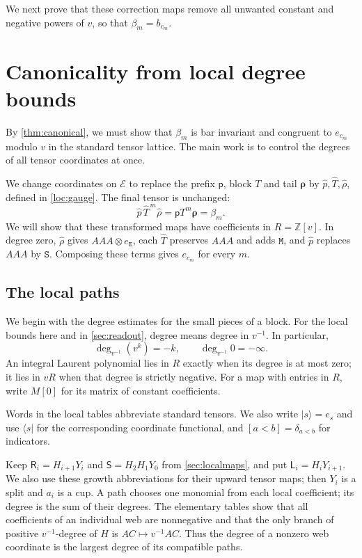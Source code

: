 \documentclass[a4paper,11pt]{amsart}
\newcommand{\Z}{\mathbb Z}
\newcommand{\wordstart}{\mathtt{S}}
\newcommand{\wordmiddle}{\mathtt{M}}
\newcommand{\wordend}{\mathtt{E}}
\newcommand{\pp}{\mathsf p}
\newcommand{\tailmap}{\boldsymbol{\rho}}
\newcommand{\tpar}{v}
\newcommand{\vpar}{{\tpar^{-1}}}
\numberwithin{equation}{subsection}
\theoremstyle{plain}
\theoremstyle{definition}
\theoremstyle{remark}
\begin{document}
We next prove that these correction maps remove all unwanted constant
and negative powers of $\tpar$, so that $\beta_m=b_{c_m}$.

\section{Canonicality from local degree bounds}\label{sec:canonicality}

By \autoref{thm:canonical}, we must show that $\beta_m$ is bar invariant
and congruent to $e_{c_m}$ modulo $\tpar$ in the standard tensor lattice.
The main work is to control the degrees of all tensor coordinates
at once.

We change coordinates on $\mathcal E$ to replace the prefix $\pp$,
block $T$ and tail $\tailmap$ by $\widehat p,\widehat T,\widehat\rho$,
defined in \autoref{loc:gauge}. The final tensor is unchanged:
{
\[
\widehat p\,\widehat T^{\,m}\widehat\rho=\pp T^m\tailmap=\beta_m.
\]
}
We will show that these transformed maps have coefficients in $R=\Z[\tpar]$.
In degree zero, $\widehat\rho$ gives $AAA\otimes e_{\wordend}$,
each $\widehat T$ preserves $AAA$ and adds $\wordmiddle$, and
$\widehat p$ replaces $AAA$ by $\wordstart$. Composing these terms gives
$e_{c_m}$ for every $m$.

\subsection{The local paths}

We begin with the degree estimates for the small pieces of a block.
For the local bounds here and in \autoref{sec:readout}, degree means
degree in $\vpar$. In particular,
\[
\deg_{\vpar}(\tpar^k)=-k,\qquad \deg_{\vpar}0=-\infty.
\]
An integral Laurent polynomial lies in $R$ exactly when its degree
is at most zero; it lies in $\tpar R$ when that degree is strictly negative.
For a map with entries in $R$, write $M[0]$ for its matrix of constant coefficients.

Words in the local tables abbreviate standard tensors. We also write
$|s\rangle=e_s$ and use $\langle s|$ for the corresponding coordinate
functional, and $[a<b]=\delta_{a<b}$ for indicators.

Keep $\mathsf R_i=H_{i+1}Y_i$ and $\mathsf S=H_2H_1Y_0$ from
\autoref{sec:localmaps}, and put $\mathsf L_i=H_iY_{i+1}$.
We also use these growth abbreviations for their upward tensor maps;
then $Y_i$ is a split and $a_i$ is a cup. A path 
chooses one monomial from each local coefficient; its
degree is the sum of their degrees. The elementary tables show that
all coefficients of an individual web are nonnegative and that the
only branch of positive $\vpar$-degree of $H$ is $AC\mapsto \tpar^{-1} AC$.
Thus the degree of a nonzero web coordinate is the largest
degree of its compatible paths.
\end{document}
